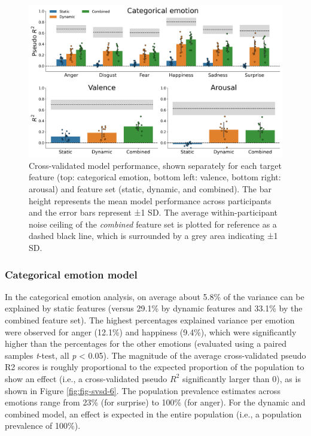 \documentclass[11pt,american,]{memoir} %
\begin{document}
\begin{figure}
\centering
\includegraphics{_bookdown_files/static-vs-dynamic-files/figures/figure_5.pdf}
\caption{\label{fig:fig-svsd-5}Cross-validated model performance, shown separately for each target feature (top: categorical emotion, bottom left: valence, bottom right: arousal) and feature set (static, dynamic, and combined). The bar height represents the mean model performance across participants and the error bars represent ±1 SD. The average within-participant noise ceiling of the \emph{combined} feature set is plotted for reference as a dashed black line, which is surrounded by a grey area indicating ±1 SD.}
\end{figure}



\hypertarget{categorical-emotion-model}{%
\subsubsection{Categorical emotion model}\label{categorical-emotion-model}}

In the categorical emotion analysis, on average about 5.8\% of the variance can be explained by static features (versus 29.1\% by dynamic features and 33.1\% by the combined feature set). The highest percentages explained variance per emotion were observed for anger (12.1\%) and happiness (9.4\%), which were significantly higher than the percentages for the other emotions (evaluated using a paired samples \emph{t}-test, all \emph{p} \textless{} 0.05). The magnitude of the average cross-validated pseudo R2 scores is roughly proportional to the expected proportion of the population to show an effect (i.e., a cross-validated pseudo \(R^{2}\) significantly larger than 0), as is shown in Figure \ref{fig:fig-svsd-6}. The population prevalence estimates across emotions range from 23\% (for surprise) to 100\% (for anger). For the dynamic and combined model, an effect is expected in the entire population (i.e., a population prevalence of 100\%).
\end{document}
